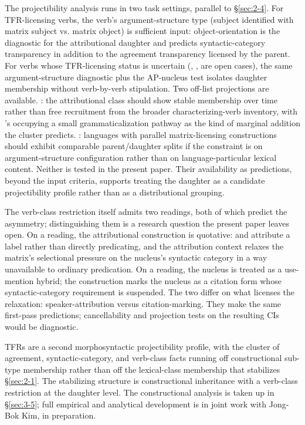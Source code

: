 The projectibility analysis runs in two task settings, parallel to §\ref{sec:2-4}. For  TFR-licensing verbs, the verb's argument-structure type (subject identified with matrix subject vs. matrix object) is sufficient input: object-orientation is the diagnostic for the attributional daughter and predicts syntactic-category transparency in addition to the agreement transparency licensed by the parent. For  verbs whose TFR-licensing status is uncertain (, ,  are open cases), the same argument-structure diagnostic plus the AP-nucleus test isolates daughter membership without verb-by-verb stipulation. Two off-list projections are available. : the attributional class should show stable membership over time rather than free recruitment from the broader characterizing-verb inventory, with 's occupying a small grammaticalization pathway as the kind of marginal addition the cluster predicts. : languages with parallel matrix-licensing constructions should exhibit comparable parent/daughter splits if the constraint is on argument-structure configuration rather than on language-particular lexical content. Neither is tested in the present paper. Their availability as predictions, beyond the input criteria, supports treating the daughter as a candidate projectibility profile rather than as a distributional grouping.

The verb-class restriction itself admits two readings, both of which predict the asymmetry; distinguishing them is a research question the present paper leaves open. On a  reading, the attributional construction is quotative:  and  attribute a label rather than directly predicating, and the attribution context relaxes the matrix's selectional pressure on the nucleus's syntactic category in a way unavailable to ordinary predication. On a  reading, the nucleus is treated as a use-mention hybrid; the construction marks the nucleus as a citation form whose syntactic-category requirement is suspended. The two differ on what licenses the relaxation: speaker-attribution versus citation-marking. They make the same first-pass predictions; cancellability and projection tests on the resulting CIs would be diagnostic.

TFRs are a second morphosyntactic projectibility profile, with the cluster of agreement, syntactic-category, and verb-class facts running off constructional sub-type membership rather than off the lexical-class membership that stabilizes §\ref{sec:2-1}. The stabilizing structure is constructional inheritance with a verb-class restriction at the daughter level. The constructional analysis is taken up in §\ref{sec:3-5}; full empirical and analytical development is in joint work with Jong-Bok Kim, in preparation.

